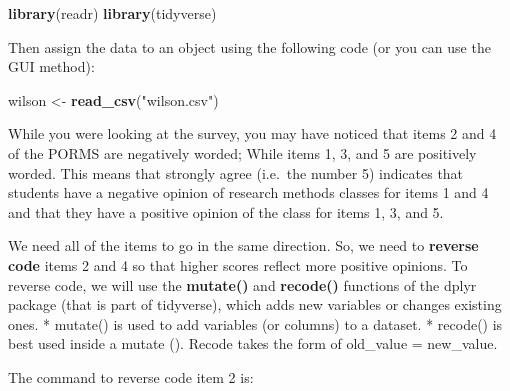 \documentclass[
]{book}
\newenvironment{Shaded}{\begin{snugshade}}{\end{snugshade}}
\newcommand{\DataTypeTok}[1]{\textcolor[rgb]{0.13,0.29,0.53}{#1}}
\newcommand{\DecValTok}[1]{\textcolor[rgb]{0.00,0.00,0.81}{#1}}
\newcommand{\KeywordTok}[1]{\textcolor[rgb]{0.13,0.29,0.53}{\textbf{#1}}}
\newcommand{\NormalTok}[1]{#1}
\newcommand{\OperatorTok}[1]{\textcolor[rgb]{0.81,0.36,0.00}{\textbf{#1}}}
\newcommand{\StringTok}[1]{\textcolor[rgb]{0.31,0.60,0.02}{#1}}
\begin{document}
\begin{Shaded}
\begin{Highlighting}[]
\KeywordTok{library}\NormalTok{(readr)}
\KeywordTok{library}\NormalTok{(tidyverse)}
\end{Highlighting}
\end{Shaded}

Then assign the data to an object using the following code (or you can use the GUI method):

\begin{Shaded}
\begin{Highlighting}[]
\NormalTok{wilson <-}\StringTok{ }\KeywordTok{read_csv}\NormalTok{(}\StringTok{"wilson.csv"}\NormalTok{) }
\end{Highlighting}
\end{Shaded}

While you were looking at the survey, you may have noticed that items 2 and 4 of the PORMS are negatively worded; While items 1, 3, and 5 are positively worded. This means that strongly agree (i.e.~the number 5) indicates that students have a negative opinion of research methods classes for items 1 and 4 and that they have a positive opinion of the class for items 1, 3, and 5.

We need all of the items to go in the same direction. So, we need to \textbf{reverse code} items 2 and 4 so that higher scores reflect more positive opinions. To reverse code, we will use the \textbf{mutate()} and \textbf{recode()} functions of the dplyr package (that is part of tidyverse), which adds new variables or changes existing ones.
* mutate() is used to add variables (or columns) to a dataset.
* recode() is best used inside a mutate (). Recode takes the form of old\_value = new\_value.

The command to reverse code item 2 is:

\begin{Shaded}
\end{Shaded}
\end{document}
